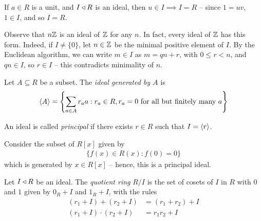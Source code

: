 \documentclass{../../template/note}
\begin{document}
    \begin{remark*}
        If $a \in R$ is a unit, and $I \triangleleft R$ is an ideal, then $u \in I \implies I = R$ -- since $1 = uv$, $1 \in I$, and so $I = R$.
    \end{remark*}
    
    \begin{example}
        Observe that $n\mathbb Z$ is an ideal of $\mathbb Z$ for any $n$. In fact, every ideal of $\mathbb Z$ has this form. Indeed, if $I \neq \{0\}$, let $n \in \mathbb Z$ be the minimal positive element of $I$. By the Euclidean algorithm, we can write $m \in I$ as $m = qn + r$, with $0 \leq r < n$, and $qn \in I$, so $r \in I$ -- this contradicts minimality of $n$.
    \end{example}

    
    \begin{definition}
        Let $A \subseteq R$ be a subset. The \emph{ideal generated by $A$}
        is
        \begin{align*}
            \left \langle A \right \rangle = \left\{\sum_{a \in A}r_aa : r_a \in R, r_a = 0 \text{ for all but finitely many }a\right\}
        \end{align*}
    \end{definition}
    
    \begin{definition}
        An ideal is called \emph{principal} if there exists $r \in R$ such that $I = \left \langle r \right \rangle$.
    \end{definition}
    
    \begin{example}
        Consider the subset of $R[x]$ given by
        \begin{align*}
            \{f(x) \in R(x): f(0) = 0\}
        \end{align*}
        which is generated by $x \in R[x]$ -- hence, this is a principal ideal.        
    \end{example}
    
    \begin{definition}[Quotients]
        Let $I \triangleleft R$ be an ideal. The \emph{quotient ring} $R/I$ is the set of cosets of $I$ in $R$ with $0$ and $1$ given by $0_R + I$ and $1_R + I$, with the rules
        \begin{align*}
            (r_1 + I) + (r_2 + I) &= (r_1 + r_2) + I \\
            (r_1 + I) \cdot (r_2 + I) &= r_1r_2 + I
        \end{align*}
    \end{definition}
    
\end{document}
